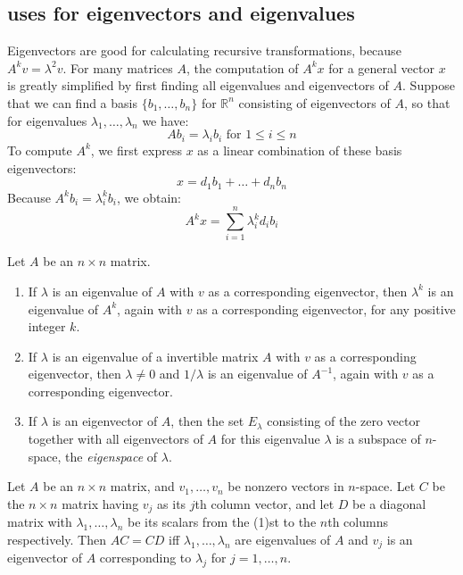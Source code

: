 \documentclass[nobib,notoc]{tufte-handout}
\begin{document}
\subsection{uses for eigenvectors and eigenvalues}
Eigenvectors are good for calculating recursive transformations, because \(A^kv=\lambda^2v\). For many matrices \(A\), the computation of \(A^kx\) for a general vector \(x\) is greatly simplified by first finding all eigenvalues and eigenvectors of \(A\). Suppose that we can find a basis \(\{b_1,\ldots,b_n\}\) for \(\mathbb{R}^n\) consisting of eigenvectors of \(A\), so that for eigenvalues \(\lambda_1,\ldots,\lambda_n\) we have:
\begin{equation*}
	Ab_i=\lambda_ib_i\text{ for }1\leq i\leq n
\end{equation*}
To compute \(A^k\), we first express \(x\) as a linear combination of these basis eigenvectors:
\begin{equation*}
	x=d_1b_1+\ldots+d_nb_n
\end{equation*}
Because \(A^kb_i=\lambda_i^kb_i\), we obtain:
\begin{equation*}
	A^kx=\sum_{i=1}^n\lambda_i^kd_ib_i
\end{equation*}
\begin{thm}
	Let \(A\) be an \(n\times n\) matrix.
	\begin{enumerate}
		\item If \(\lambda\) is an eigenvalue of \(A\) with \(v\) as a corresponding eigenvector, then \(\lambda^k\) is an eigenvalue of \(A^k\), again with \(v\) as a corresponding eigenvector, for any positive integer \(k\).
		\item If \(\lambda\) is an eigenvalue of a invertible matrix \(A\) with \(v\) as a corresponding eigenvector, then \(\lambda\neq 0\) and \(1/\lambda\) is an eigenvalue of \(A^{-1}\), again with \(v\) as a corresponding eigenvector.
		\item If \(\lambda\) is an eigenvector of \(A\), then the set \(E_\lambda\) consisting of the zero vector together with all eigenvectors of \(A\) for this eigenvalue \(\lambda\) is a subspace of \(n\)-space, the \emph{eigenspace} of \(\lambda\).
	\end{enumerate}
\end{thm}
\begin{thm}
	Let \(A\) be an \(n\times n\) matrix, and \(v_1,\ldots,v_n\) be nonzero vectors in \(n\)-space. Let \(C\) be the \(n\times n\) matrix having \(v_j\) as its \(j\)th column vector, and let \(D\) be a diagonal matrix with \(\lambda_1,\ldots,\lambda_n\) be its scalars from the (1)st to the \(n\)th columns respectively. Then \(AC=CD\) iff \(\lambda_1,\ldots,\lambda_n\) are eigenvalues of \(A\) and \(v_j\) is an eigenvector of \(A\) corresponding to \(\lambda_j\) for \(j=1,\ldots,n\).
\end{thm}
\end{document}
